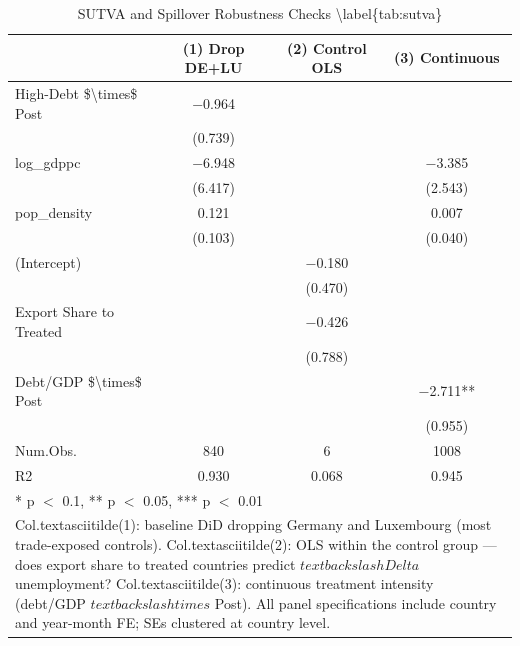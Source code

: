 \begin{table}
\centering
\caption{SUTVA and Spillover Robustness Checks \textbackslash{}label\{tab:sutva\}}
\centering
\begin{tabular}[t]{lccc}
\toprule
  & (1) Drop DE+LU & (2) Control OLS & (3) Continuous\\
\midrule
High-Debt \$\textbackslash{}times\$ Post & \num{-0.964} &  & \\
 & (\num{0.739}) &  & \\
log\_gdppc & \num{-6.948} &  & \num{-3.385}\\
 & (\num{6.417}) &  & (\num{2.543})\\
pop\_density & \num{0.121} &  & \num{0.007}\\
 & (\num{0.103}) &  & (\num{0.040})\\
(Intercept) &  & \num{-0.180} & \\
 &  & (\num{0.470}) & \\
Export Share to Treated &  & \num{-0.426} & \\
 &  & (\num{0.788}) & \\
Debt/GDP \$\textbackslash{}times\$ Post &  &  & \num{-2.711}**\\
 &  &  & (\num{0.955})\\
\midrule
Num.Obs. & \num{840} & \num{6} & \num{1008}\\
R2 & \num{0.930} & \num{0.068} & \num{0.945}\\
\bottomrule
\multicolumn{4}{l}{\rule{0pt}{1em}* p $<$ 0.1, ** p $<$ 0.05, *** p $<$ 0.01}\\
\multicolumn{4}{l}{\rule{0pt}{1em}Col.textasciitilde{}(1): baseline DiD dropping Germany and Luxembourg (most trade-exposed controls). Col.textasciitilde{}(2): OLS within the control group --- does export share to treated countries predict $textbackslash{}Delta$ unemployment? Col.textasciitilde{}(3): continuous treatment intensity (debt/GDP $textbackslash{}times$ Post). All panel specifications include country and year-month FE; SEs clustered at country level.}\\
\end{tabular}
\end{table}
